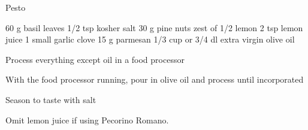 
\begin{recipe}{Pesto}{}
\begin{ingredients}
60 g basil leaves 
1/2 tsp kosher salt
30 g pine nuts
zest of 1/2 lemon
2 tsp lemon juice
1 small garlic clove
15 g parmesan
1/3 cup or 3/4 dl extra virgin olive oil
\end{ingredients}
\nextcolumn
\begin{steps}
    \item Process everything except oil in a food processor
    \item With the food processor running, pour in olive oil and process until incorporated
    \item Season to taste with salt
\end{steps}
Omit lemon juice if using Pecorino Romano.
\end{recipe}

